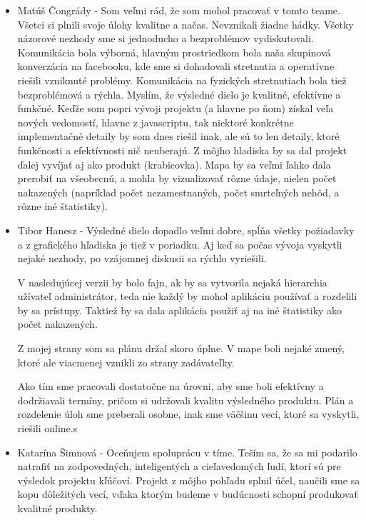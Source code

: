 \documentclass[12pt,a4paper]{report}
\begin{document}
\begin{itemize}
	\item Matúš Čongrády - Som veľmi rád, že som mohol pracovať v tomto teame. Všetci si plnili svoje úlohy kvalitne a načas. Nevznikali žiadne hádky. Všetky názorové nezhody sme si jednoducho a bezproblémov vydiskutovali. Komunikácia bola výborná, hlavným prostriedkom bola naša skupinová konverzácia na facebooku, kde sme si dohadovali stretnutia a operatívne riešili vzniknuté problémy. Komunikácia na fyzických stretnutiach bola tiež bezproblémová a rýchla. Myslím, že výsledné dielo je kvalitné, efektívne a funkčné. Keďže som popri vývoji projektu (a hlavne po ňom) získal veľa nových vedomostí, hlavne z javascriptu, tak niektoré konkrétne implementačné detaily by som dnes riešil inak, ale sú to len detaily, ktoré funkčnosti a efektívnosti nič neuberajú. Z môjho hladiska by sa dal projekt ďalej vyvíjať aj ako produkt (krabicovka). Mapa by sa veľmi ľahko dala prerobiť na všeobecnú, a mohla by vizualizovať rôzne údaje, nielen počet nakazených (napríklad počet nezamestnaných, počet smrteľných nehôd, a rôzne iné štatistiky).
	\item Tibor Hanesz - Výsledné dielo dopadlo veľmi dobre, spĺňa všetky požiadavky a z grafického hľadiska je tiež v poriadku. Aj keď sa počas vývoja vyskytli nejaké nezhody, po vzájomnej diskusii sa rýchlo vyriešili.\par
	V nasledujúcej verzii by bolo fajn, ak by sa vytvorila nejaká hierarchia užívateľ administrátor, teda nie každý by mohol aplikáciu používať a rozdelili by sa prístupy. Taktiež by sa dala aplikácia použiť aj na iné štatistiky ako počet nakazených.\par
	Z mojej strany som sa plánu držal skoro úplne. V mape boli nejaké zmený, ktoré ale viacmenej vznikli zo strany zadávateľky.\par
	Ako tím sme pracovali dostatočne na úrovni, aby sme boli efektívny a dodržiavali termíny, pričom si udržovali kvalitu výsledného produktu. Plán a rozdelenie úloh sme preberali osobne, inak sme väčšinu vecí, ktoré sa vyskytli, riešili online.s
	\item Katarína Šimnová - Oceňujem spoluprácu v tíme. Teším sa, že sa mi podarilo natrafiť na zodpovedných, inteligentých a cieľavedomých ľudí, ktorí sú pre výsledok projektu kľúčoví. Projekt z môjho pohľadu splnil účel, naučili sme sa kopu dôležitých vecí, vďaka ktorým budeme v budúcnosti schopní produkovať kvalitné produkty.
\end{itemize}
\end{document}
